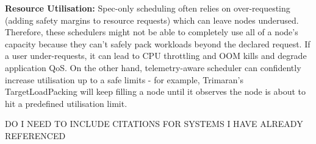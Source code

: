 \textbf{Resource Utilisation:} Spec-only scheduling often relies on
over-requesting (adding safety margins to resource requests) which can leave
nodes underused. Therefore, these schedulers might not be able to
completely use all of a node's capacity because they can't safely pack workloads
beyond the declared request. If a user under-requests, it can lead to CPU
throttling and OOM kills and degrade application QoS. On the other hand,
telemetry-aware scheduler can confidently increase utilisation up to a safe
limits - for example, Trimaran's TargetLoadPacking will keep filling a node
until it observes the node is about to hit a predefined utilisation limit.

DO I NEED TO INCLUDE CITATIONS FOR SYSTEMS I HAVE ALREADY REFERENCED

%
